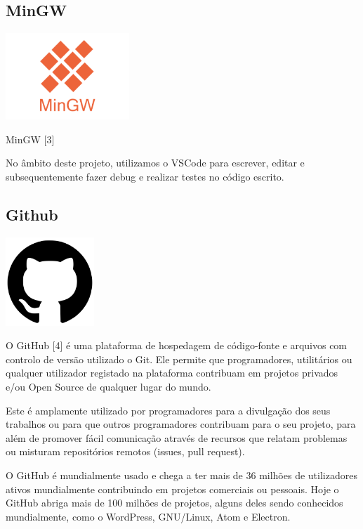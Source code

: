 \documentclass[a4paper,12pt]{article}
\begin{document}
\subsection{MinGW}
    \includegraphics[width=0.35\textwidth]{mingw.png} %
    \vspace{0.5cm}

MinGW [3]

No âmbito deste projeto, utilizamos o VSCode para escrever, editar e subsequentemente fazer debug e realizar testes no código escrito.

\subsection{Github}
    \includegraphics[width=0.25\textwidth]{github.png} %
    \vspace{0.5cm}

O GitHub [4] é uma plataforma de hospedagem de código-fonte e arquivos com controlo de versão utilizado o Git. Ele permite que programadores, utilitários ou qualquer utilizador registado na plataforma contribuam em projetos privados e/ou Open Source de qualquer lugar do mundo. 

Este é amplamente utilizado por programadores para a divulgação dos seus trabalhos ou para que outros programadores contribuam para o seu projeto, para além de promover fácil comunicação através de recursos que relatam problemas ou misturam repositórios remotos (issues, pull request).

O GitHub é mundialmente usado e chega a ter mais de 36 milhões de utilizadores ativos mundialmente contribuindo em projetos comerciais ou pessoais. Hoje o GitHub abriga mais de 100 milhões de projetos, alguns deles sendo conhecidos mundialmente, como o WordPress, GNU/Linux, Atom e Electron.
\end{document}
